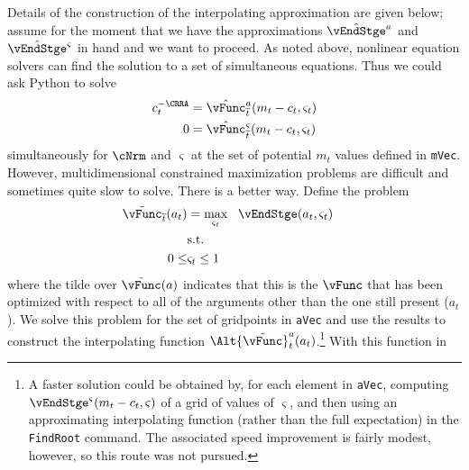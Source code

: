 \documentclass[titlepage, headings=optiontotocandhead]{\econtex}
\begin{document}
Details of the construction of the interpolating approximation are
given below; assume for the moment that we have the approximations
$\hat{\vEndStge}^{{a}}$ and $\hat{\vEndStge}^{\varsigma}$ in
hand and we want to proceed.  As noted above, nonlinear equation
solvers can find the
solution to a set of simultaneous equations.  Thus we could ask
Python to solve
\begin{equation}\begin{gathered}\begin{aligned}
      {c}_{t}^{-\CRRA}  & = \hat{\vFunc}^{a}_{\overline{t}}({m}_{t}-{c}_{t},\varsigma_{t}) %
      \\      0  & = \hat{\vFunc}^{\varsigma}_{\overline{t}}({m}_{t}-{c}_{t},\varsigma_{t}) \label{eq:FOCwrtw}
    \end{aligned}\end{gathered}\end{equation}
simultaneously for $\cNrm$ and $\varsigma$ at the set of potential ${m}_{t}$ values defined in
\texttt{mVec}. However, multidimensional constrained
maximization problems are difficult and sometimes quite slow to
solve.  There is a better way.  Define the problem
\providecommand{\Opt}{}
\renewcommand{\Opt}{\tilde}
\providecommand{\vOpt}{}
\renewcommand{\vOpt}{\overset{*}{\vFunc}}
\begin{equation}\begin{gathered}\begin{aligned}
      \Opt{\vFunc}_{\overline{t}}({a}_{t})  & = \max_{\varsigma_{t}} ~~  \vEndStge({a}_{t},\varsigma_{t})
      \\      & \text{s.t.} & \nonumber
      \\      0 \leq & \varsigma_{t} \leq 1
    \end{aligned}\end{gathered}\end{equation}
where the tilde over $\Opt{\vFunc}(a)$ indicates that this is the $\vFunc$ that has been optimized with
respect to all of the arguments other than the one still present
(${a}_{t}$).  We solve this problem for the set of gridpoints in
\texttt{aVec} and use the results to construct the interpolating
function $\Alt{\Opt{\vFunc}}_{t}^{a}({a}_{t})$.\footnote{A faster solution
  could be obtained by, for each element in \texttt{aVec}, computing
  $\vEndStge^{\varsigma}({m}_{t}-{c}_{t},\varsigma)$ of a grid of
  values of $\varsigma$, and then using an approximating interpolating
  function (rather than the full expectation) in the \texttt{FindRoot}
  command.  The associated speed improvement is fairly modest,
  however, so this route was not pursued.}  With this function in
\end{document}
